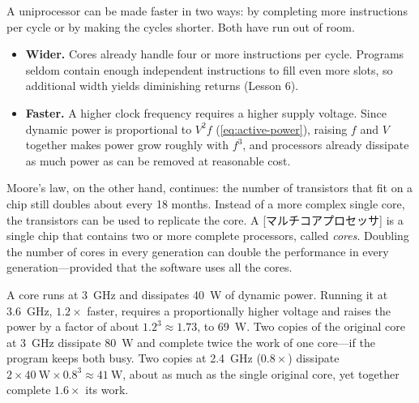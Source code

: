 \documentclass[../main.tex]{subfiles}
\begin{document}
A uniprocessor can be made faster in two ways: by completing more
instructions per cycle or by making the cycles shorter.  Both have run out of room.
\begin{itemize}
  \item \textbf{Wider.}  Cores already handle four or more
    instructions per cycle.  Programs seldom contain enough independent
    instructions to fill even more slots, so additional width yields
    diminishing returns (Lesson 6).
  \item \textbf{Faster.}  A higher clock frequency requires a higher supply
    voltage.  Since dynamic
    power is proportional to $V^{2}f$
    (\cref{eq:active-power}), raising $f$ and $V$ together makes power grow
    roughly with $f^{3}$, and processors already dissipate as much power as
    can be removed at reasonable cost.
\end{itemize}

Moore's law, on the other hand, continues: the number of transistors that
fit on a chip still doubles about every 18 months.  Instead of a more
complex single core, the transistors can be used to replicate the core.  A
[マルチコアプロセッサ] is a single chip that
contains two or more complete processors, called \emph{cores}.  Doubling
the number of cores in every generation can double the performance in every
generation---provided that the software uses all the cores.

\begin{example}
  \label{ex:l18-power}
  A core runs at \SI{3}{\giga\hertz} and dissipates \SI{40}{\watt} of dynamic
  power.  Running it at \SI{3.6}{\giga\hertz}, $1.2\times$ faster, requires
  a proportionally higher voltage and raises the power by a factor of about
  $1.2^{3}\approx 1.73$, to \SI{69}{\watt}.  Two copies of the original core
  at \SI{3}{\giga\hertz} dissipate \SI{80}{\watt} and complete twice the
  work of one core---if the program keeps both busy.  Two copies at
  \SI{2.4}{\giga\hertz} ($0.8\times$) dissipate
  $2\times\SI{40}{\watt}\times 0.8^{3}\approx\SI{41}{\watt}$, about as much
  as the single original core, yet together complete $1.6\times$ its work.
\end{example}
\end{document}
